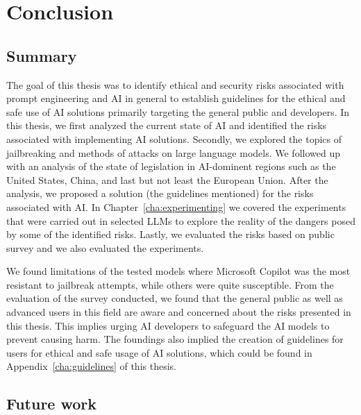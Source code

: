 \chapter{Conclusion}

\section{Summary}

The goal of this thesis was to identify ethical and security risks associated with prompt engineering and AI in general to establish guidelines for the ethical and safe use of AI solutions primarily targeting the general public and developers. In this thesis, we first analyzed the current state of AI and identified the risks associated with implementing AI solutions. Secondly, we explored the topics of jailbreaking and methods of attacks on large language models. We followed up with an analysis of the state of legislation in AI-dominent regions such as the United States, China, and last but not least the European Union. After the analysis, we proposed a solution (the guidelines mentioned) for the risks associated with AI. In Chapter~\ref{cha:experimenting} we covered the experiments that were carried out in selected LLMs to explore the reality of the dangers posed by some of the identified risks. Lastly, we evaluated the risks based on public survey and we also evaluated the experiments. 

We found limitations of the tested models where Microsoft Copilot was the most resistant to jailbreak attempts, while others were quite susceptible. From the evaluation of the survey conducted, we found that the general public as well as advanced users in this field are aware and concerned about the risks presented in this thesis. This implies urging AI developers to safeguard the AI models to prevent causing harm. The foundings also implied the creation of guidelines for users for ethical and safe usage of AI solutions, which could be found in Appendix~\ref{cha:guidelines} of this thesis.


\section{Future work}



